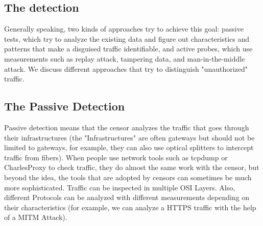 \documentclass[conference]{IEEEtran}
\begin{document}
\subsection{The detection}\label{sec:detecion}
Generally speaking, two kinds of approaches try to achieve this goal: passive tests, which try to analyze the existing data and figure out characteristics and patterns that make a disguised traffic identifiable, and active probes, which use measurements such as replay attack, tampering data, and man-in-the-middle attack. We discuss different approaches that try to distinguish "unauthorized" traffic.

\subsection{The Passive Detection}
Passive detection means that the censor analyzes the traffic that goes through their infrastructures (the "Infrastructures" are often gateways but should not be limited to gateways, for example, they can also use optical splitters to intercept traffic from fibers). When people use network tools such as tcpdump or CharlesProxy\texttrademark{} to check traffic, they do almost the same work with the censor, but beyond the idea, the tools that are adopted by censors can sometimes be much more sophisticated. Traffic can be inspected in multiple OSI Layers. Also, different Protocols can be analyzed with different measurements depending on their characteristics (for example, we can analyze a HTTPS traffic with the help of a MITM Attack).
\end{document}
